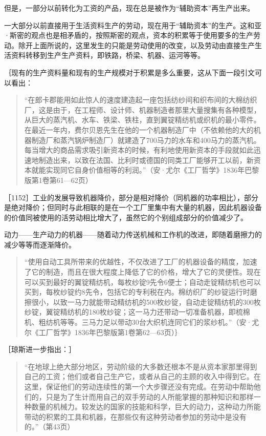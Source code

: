 但是，一部分以前转化为工资的产品，现在总是被作为“辅助资本”再生产出来。

一大部分以前直接用于生活资料生产的劳动，现在用于“辅助资本”的生产。这和亚·斯密的观点也是相矛盾的，按照斯密的观点，资本的积累等于使用要多的生产劳动。除开上面所说的，这里发生的只能是劳动使用的改变，以及劳动由直接生产生活资料转移到生产生产资料，即铁路，桥梁、机器、运河等等。


｛现有的生产资料量和现有的生产规模对于积累是多么重要，这从下面一段引文可以看出：

\begin{quote}{“在郎卡郡能用如此惊人的速度建造起一座包括纺纱间和织布间的大棉纺织厂，这是由于，在工程师、设计师、机器制造者那里大量搜集有各种模型，从巨大的蒸汽机、水车、铁梁、铁柱，直到翼锭精纺机或织机的最小零件。在最近一年内，费尔贝恩先生在他的一个机器制造厂中（不依赖他的大的机器制造厂和蒸汽锅炉制造厂）就建造了700马力的水车和400马力的蒸汽机。每当增大的商品需求吸引新资本的时候，有利地使用新资本的手段就如此迅速地制造出来，以致在法国、比利时或德国的同类工厂能够开工以前，新资本就能实现同它自身价值相等的利润。”（安·尤尔《工厂哲学》1836年巴黎版第1卷第61—62页）}\end{quote}

［1152］工业的发展导致机器降价，部分是相对降价（同机器的功率相比），部分是绝对降价；但同时与此相联的是在一个工厂里集中有大量的机器，因此机器设备的价值同被使用的活劳动相比增大了，虽然它的个别组成部分的价值减少了。

动力——生产动力的机器——随着动力传送机械和工作机的改进，即随着磨擦力的减少等等而逐渐降价。

\begin{quote}{“使用自动工具所带来的优越性，不仅改进了工厂的机器设备的精度，加速了它的制造，而且在很大程度上降低了它的价格，增大了它的灵便性。现在可以买到最好的翼锭精纺机，每枚纱锭9先令6便士；自动走锭精纺机也可以买到，每枚纱锭约8先令，包括它的专利税在内。棉纺织厂的纱锭运行时磨擦很小，以致一马力就能带动精纺机的500枚纱锭，自动走锭精纺机的300枚纱锭，翼锭精纺机的180枚纱锭；这一马力还带动一切准备机器，即梳棉机、粗纺机等等。三马力足以带动30台大织机连同它们的浆纱机。”（安·尤尔《工厂哲学》1836年巴黎版第1卷第62—63页）｝}\end{quote}


［琼斯进一步指出：］

\begin{quote}{“在地球上绝大部分地区，劳动阶级的大多数还根本不是从资本家那里得到自己的工资；他们或者自己生产它，或者从自己的主顾的收入中得到它。在这里，保证他们的劳动连续性的第一个大步骤还没有完成。在劳动中帮助他们的，只是为了生计而用自己的双手劳动的人所能掌握的那种知识和那样一种数量的机械力。较发达的国家的技能和科学，巨大的动力，这种动力所能带动的积累的工具和机器，在那些仅有这种劳动者参加的劳动中是没有的。”（第43页）}\end{quote}

